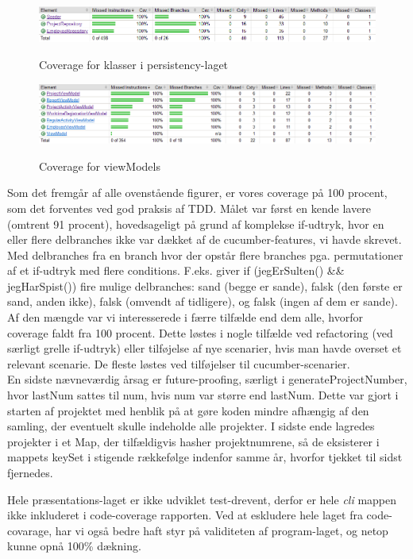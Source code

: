 \begin{figure}[H]
    \centering
    \caption{Coverage for klasser i persistency-laget}
    \includegraphics[width = 12cm, keepaspectratio]{ImplementationAndTest/Diagrams/coverage/coverage_persistency.png}
    \label{fig:coverage_persistency}
\end{figure}
\begin{figure}[H]
    \centering
    \caption{Coverage for viewModels}
    \includegraphics[width = 12cm, keepaspectratio]{ImplementationAndTest/Diagrams/coverage/coverage_viewModels.png}
    \label{fig:coverage_viewModels}
\end{figure}
Som det fremgår af alle ovenstående figurer, er vores coverage på 100 procent, som det forventes ved god praksis af TDD. Målet var først en kende lavere (omtrent 91 procent), hovedsageligt på grund af komplekse if-udtryk, hvor en eller flere delbranches ikke var dækket af de cucumber-features, vi havde skrevet. Med delbranches fra en branch hvor der opstår flere branches pga. permutationer af et if-udtryk med flere conditions. F.eks. giver if (jegErSulten() \&\& jegHarSpist()) fire mulige delbranches: sand (begge er sande), falsk (den første er sand, anden ikke), falsk (omvendt af tidligere), og falsk (ingen af dem er sande). Af den mængde var vi interesserede i færre tilfælde end dem alle, hvorfor coverage faldt fra 100 procent. Dette løstes i nogle tilfælde ved refactoring (ved særligt grelle if-udtryk) eller tilføjelse af nye scenarier, hvis man havde overset et relevant scenarie. De fleste løstes ved tilføjelser til cucumber-scenarier.\\[4mm] En sidste nævneværdig årsag er future-proofing, særligt i generateProjectNumber, hvor lastNum sattes til num, hvis num var større end lastNum. Dette var gjort i starten af projektet med henblik på at gøre koden mindre afhængig af den samling, der eventuelt skulle indeholde alle projekter. I sidste ende lagredes projekter i et Map, der tilfældigvis hasher projektnumrene, så de eksisterer i mappets keySet i stigende rækkefølge indenfor samme år, hvorfor tjekket til sidst fjernedes. 

Hele præsentations-laget er ikke udviklet test-drevent, derfor er hele \textit{cli} mappen ikke inkluderet i code-coverage rapporten. Ved at eskludere hele laget fra code-covarage, har vi også bedre haft styr på validiteten af program-laget, og netop kunne opnå 100\% dækning.